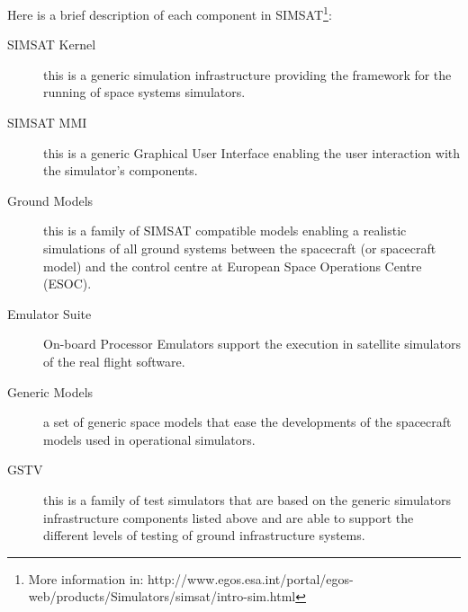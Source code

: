 Here is a brief description of each component in \ac{SIMSAT}\footnote{More information in: http://www.egos.esa.int/portal/egos-web/products/Simulators/simsat/intro-sim.html}:
\begin{description}
\item[\ac{SIMSAT} Kernel] this is a generic simulation infrastructure providing the framework for the running of space systems simulators.
\item[\ac{SIMSAT} \ac{MMI}] this is a generic Graphical User Interface enabling the user interaction with the simulator's components.
\item[Ground Models] this is a family of \ac{SIMSAT} compatible models enabling a realistic simulations of all ground systems between the spacecraft (or spacecraft model) and the control centre at European Space Operations Centre (ESOC).
\item[Emulator Suite] On-board Processor Emulators support the execution in satellite simulators of the real flight software.
\item[Generic Models] a set of generic space models that ease the developments of the spacecraft models used in operational simulators.
\item[\ac{GSTV}] this is a family of test simulators that are based on the generic simulators infrastructure components listed above and are able to support the different levels of testing of ground infrastructure systems.
\end{description}

